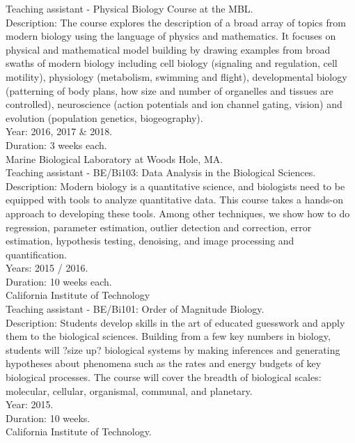 \documentclass[]{friggeri-cv}
\begin{document}
Teaching assistant - Physical Biology Course at the MBL.\\
Description: The course explores the description of a broad array of topics from modern biology using the language of physics and mathematics. It focuses on physical and mathematical model building by drawing examples from broad swaths of modern biology including cell biology (signaling and regulation, cell motility), physiology (metabolism, swimming and flight), developmental biology (patterning of body plans, how size and number of organelles and tissues are controlled), neuroscience (action potentials and ion channel gating, vision) and evolution (population genetics, biogeography).\\
Year: 2016, 2017 \& 2018.\\
Duration: 3 weeks each.\\
{Marine Biological Laboratory at Woods Hole, MA.}\\

Teaching assistant - BE/Bi103: Data Analysis in the Biological Sciences.\\
Description: Modern biology is a quantitative science, and biologists need to be equipped with tools to analyze quantitative data. This course takes a hands-on approach to developing these tools. Among other techniques, we show how to do regression, parameter estimation, outlier detection and correction, error estimation, hypothesis testing, denoising, and image processing and quantification.\\
Years: 2015 / 2016.\\
Duration: 10 weeks each.\\
{California Institute of Technology}\\

Teaching assistant - BE/Bi101: Order of Magnitude Biology.\\
Description: Students develop skills in the art of educated guesswork and apply them to the biological sciences. Building from a few key numbers in biology, students will ?size up? biological systems by making inferences and generating hypotheses about phenomena such as the rates and energy budgets of key biological processes. The course will cover the breadth of biological scales: molecular, cellular, organismal, communal, and planetary.\\
Year: 2015.\\
Duration: 10 weeks.\\
{California Institute of Technology.}\\
\end{document}
